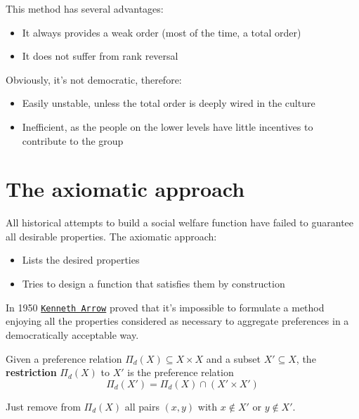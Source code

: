 This method has several advantages:
\begin{itemize}
	\item It always provides a weak order (most of the time, a total order)
	
	\item It does not suffer from rank reversal
\end{itemize}

Obviously, it's not democratic, therefore: 
\begin{itemize}
	\item Easily unstable, unless the total order is deeply wired in the culture
	
	\item Inefficient, as the people on the lower levels have little incentives to contribute to the group 
\end{itemize}


\section{The axiomatic approach}

All historical attempts to build a social welfare function have failed to guarantee all desirable properties. The axiomatic approach: 
\begin{itemize}
	\item Lists the desired properties
	
	\item Tries to design a function that satisfies them by construction
\end{itemize}

In 1950 \href{https://en.wikipedia.org/wiki/Kenneth_Arrow}{\texttt{Kenneth Arrow}} proved that it's impossible to formulate a method enjoying all the properties considered as necessary to aggregate preferences in a democratically acceptable way. \\

\begin{definition}
	Given a preference relation $\Pi_d (X) \subseteq X \times X$ and a subset $X' \subseteq X$, the \textbf{restriction} $\Pi_d (X)$ to $X'$ is the preference relation
	$$ \Pi_d (X') = \Pi_d (X) \cap (X' \times X') $$
\end{definition}

Just remove from $\Pi_d (X)$ all pairs $(x,y)$ with $x \notin X'$ or $y \notin X'$. \\

